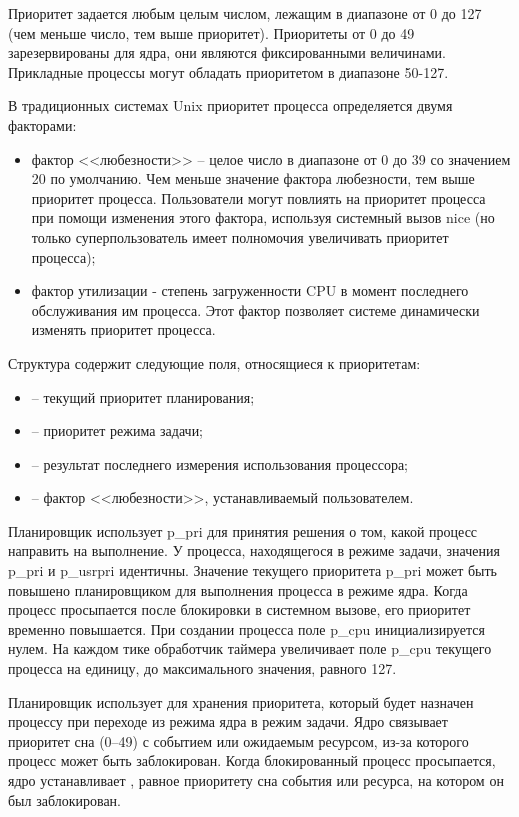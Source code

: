 Приоритет задается любым целым числом, лежащим в диапазоне от 0 до 127 (чем меньше число, тем выше приоритет). Приоритеты от 0 до 49 зарезервированы для ядра, они являются фиксированными величинами. Прикладные процессы могут обладать приоритетом в диапазоне 50-127.


В традиционных системах Unix приоритет процесса определяется двумя факторами: 

\begin{itemize}[label=---]
	\item фактор <<любезности>> – целое число в диапазоне от 0 до 39 со значением 20 по умолчанию. Чем меньше значение фактора любезности, тем выше приоритет процесса. Пользователи могут повлиять на приоритет процесса при помощи изменения этого фактора, используя системный вызов {\ttfamily nice} (но только суперпользователь имеет полномочия увеличивать приоритет процесса);
	
	\item фактор утилизации - степень загруженности CPU в момент последнего обслуживания им процесса. Этот фактор позволяет системе динамически изменять приоритет процесса.
\end{itemize}

Структура  содержит следующие поля, относящиеся к приоритетам:
\begin{itemize}[label=---]
	\item {} -- текущий приоритет планирования;
	\item {} -- приоритет режима задачи;
	\item {} -- результат последнего измерения использования процессора;
	\item {} -- фактор <<любезности>>, устанавливаемый пользователем.
\end{itemize}

Планировщик использует p\_pri для принятия решения о том, какой процесс направить на выполнение. У процесса, находящегося в режиме задачи, значения p\_pri и p\_usrpri идентичны. Значение текущего приоритета p\_pri может быть повышено планировщиком для выполнения процесса в режиме ядра. Когда процесс просыпается после блокировки в системном вызове, его приоритет временно повышается. При создании процесса поле p\_cpu инициализируется нулем. На каждом тике обработчик таймера увеличивает поле p\_cpu текущего процесса на единицу, до максимального значения, равного 127.

Планировщик использует  для хранения приоритета, который будет назначен процессу при переходе из режима ядра в режим задачи. Ядро связывает приоритет сна (0--49) с событием или ожидаемым ресурсом, из-за которого процесс может быть заблокирован. Когда блокированный процесс просыпается, ядро устанавливает , равное приоритету сна события или ресурса, на котором он был заблокирован.

